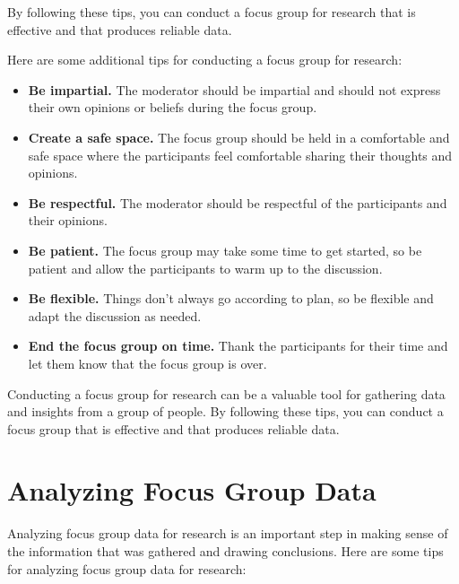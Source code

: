 \documentclass[
  b5paper]{book}
\begin{document}
By following these tips, you can conduct a focus group for research that is effective and that produces reliable data.

Here are some additional tips for conducting a focus group for research:

\begin{itemize}
\item
  \textbf{Be impartial.} The moderator should be impartial and should not express their own opinions or beliefs during the focus group.
\item
  \textbf{Create a safe space.} The focus group should be held in a comfortable and safe space where the participants feel comfortable sharing their thoughts and opinions.
\item
  \textbf{Be respectful.} The moderator should be respectful of the participants and their opinions.
\item
  \textbf{Be patient.} The focus group may take some time to get started, so be patient and allow the participants to warm up to the discussion.
\item
  \textbf{Be flexible.} Things don't always go according to plan, so be flexible and adapt the discussion as needed.
\item
  \textbf{End the focus group on time.} Thank the participants for their time and let them know that the focus group is over.
\end{itemize}

Conducting a focus group for research can be a valuable tool for gathering data and insights from a group of people. By following these tips, you can conduct a focus group that is effective and that produces reliable data.

\hypertarget{analyzing-focus-group-data}{%
\section*{Analyzing Focus Group Data}\label{analyzing-focus-group-data}}

Analyzing focus group data for research is an important step in making sense of the information that was gathered and drawing conclusions. Here are some tips for analyzing focus group data for research:
\end{document}
